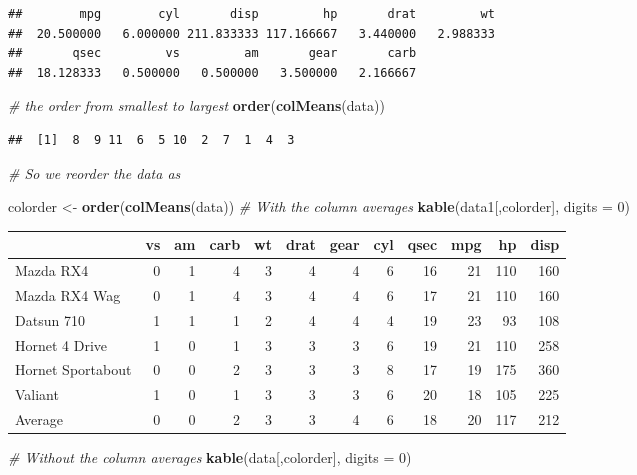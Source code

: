 \documentclass[]{article}
\newenvironment{Shaded}{\begin{snugshade}}{\end{snugshade}}
\newcommand{\KeywordTok}[1]{\textcolor[rgb]{0.13,0.29,0.53}{\textbf{#1}}}
\newcommand{\DataTypeTok}[1]{\textcolor[rgb]{0.13,0.29,0.53}{#1}}
\newcommand{\DecValTok}[1]{\textcolor[rgb]{0.00,0.00,0.81}{#1}}
\newcommand{\StringTok}[1]{\textcolor[rgb]{0.31,0.60,0.02}{#1}}
\newcommand{\CommentTok}[1]{\textcolor[rgb]{0.56,0.35,0.01}{\textit{#1}}}
\newcommand{\NormalTok}[1]{#1}
\begin{document}
\begin{verbatim}
##        mpg        cyl       disp         hp       drat         wt 
##  20.500000   6.000000 211.833333 117.166667   3.440000   2.988333 
##       qsec         vs         am       gear       carb 
##  18.128333   0.500000   0.500000   3.500000   2.166667
\end{verbatim}

\begin{Shaded}
\begin{Highlighting}[]
\CommentTok{# the order from smallest to largest}
\KeywordTok{order}\NormalTok{(}\KeywordTok{colMeans}\NormalTok{(data))}
\end{Highlighting}
\end{Shaded}

\begin{verbatim}
##  [1]  8  9 11  6  5 10  2  7  1  4  3
\end{verbatim}

\begin{Shaded}
\begin{Highlighting}[]
\CommentTok{# So we reorder the data as}

\NormalTok{colorder <-}\StringTok{ }\KeywordTok{order}\NormalTok{(}\KeywordTok{colMeans}\NormalTok{(data))}
\CommentTok{# With the column averages}
\KeywordTok{kable}\NormalTok{(data1[,colorder], }\DataTypeTok{digits =} \DecValTok{0}\NormalTok{)}
\end{Highlighting}
\end{Shaded}

\begin{longtable}[]{@{}lrrrrrrrrrrr@{}}
\toprule
& vs & am & carb & wt & drat & gear & cyl & qsec & mpg & hp &
disp\tabularnewline
\midrule
\endhead
Mazda RX4 & 0 & 1 & 4 & 3 & 4 & 4 & 6 & 16 & 21 & 110 &
160\tabularnewline
Mazda RX4 Wag & 0 & 1 & 4 & 3 & 4 & 4 & 6 & 17 & 21 & 110 &
160\tabularnewline
Datsun 710 & 1 & 1 & 1 & 2 & 4 & 4 & 4 & 19 & 23 & 93 &
108\tabularnewline
Hornet 4 Drive & 1 & 0 & 1 & 3 & 3 & 3 & 6 & 19 & 21 & 110 &
258\tabularnewline
Hornet Sportabout & 0 & 0 & 2 & 3 & 3 & 3 & 8 & 17 & 19 & 175 &
360\tabularnewline
Valiant & 1 & 0 & 1 & 3 & 3 & 3 & 6 & 20 & 18 & 105 & 225\tabularnewline
Average & 0 & 0 & 2 & 3 & 3 & 4 & 6 & 18 & 20 & 117 & 212\tabularnewline
\bottomrule
\end{longtable}

\begin{Shaded}
\begin{Highlighting}[]
\CommentTok{# Without the column averages}
\KeywordTok{kable}\NormalTok{(data[,colorder], }\DataTypeTok{digits =} \DecValTok{0}\NormalTok{)}
\end{Highlighting}
\end{Shaded}
\end{document}
